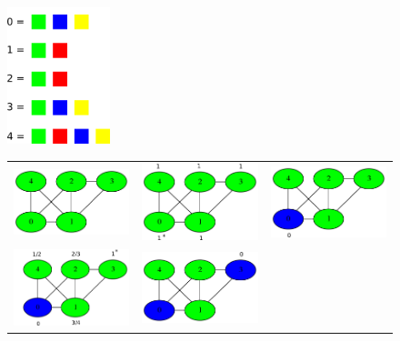 \documentclass{article}
\theoremstyle{definition}
\theoremstyle{remark}
\begin{document}
\begin{figure}
    \centering
    \begin{minipage}{0.19\textwidth}
        \includegraphics[width=3cm]{examples/4/2/example4_2_title.png}
    \end{minipage}
    \begin{minipage}{0.80\textwidth}
        \begin{tabular}{ccc}
            \includegraphics[width=4cm]{examples/4/2/example4_2_0a.png} &
            \includegraphics[width=4cm]{examples/4/2/example4_2_0b.png} &
            \includegraphics[width=4cm]{examples/4/2/example4_2_1.png} \\
            \includegraphics[width=4cm]{examples/4/2/example4_2_2.png} &
            \includegraphics[width=4cm]{examples/4/2/example4_2_3.png} &

\end{tabular}
\end{minipage}
\end{figure}
\end{document}
